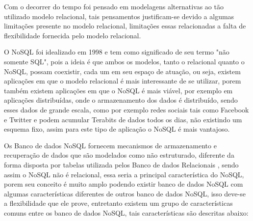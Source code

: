 \documentclass[12pt]{article}
\begin{document}
Com o decorrer do tempo foi pensado em modelagens alternativas ao tão utilizado modelo relacional, tais pensamentos justificam-se devido a algumas limitações presente no modelo relacional, limitações essas relacionadas a falta de flexibilidade fornecida pelo modelo relacional.

O NoSQL foi idealizado em 1998 e tem como significado de seu termo "não somente SQL", pois a ideia é que ambos os modelos, tanto o relacional quanto o NoSQL, possam coexistir, cada um em seu espaço de atuação, ou seja, existem aplicações em que o modelo relacional é mais interessante de se utilizar, porem também existem aplicações em que o NoSQL é mais viável, por exemplo em aplicações distribuídas, onde o armazenamento dos dados é distribuído, sendo esses dados de grande escala, como por exemplo redes sociais tais como Facebook e Twitter e podem acumular Terabits de dados todos os dias, não existindo um esquema fixo, assim para este tipo de aplicação o NoSQL é mais vantajoso.\cite{gueidi:2016} 

Os Banco de dados NoSQL fornecem mecanismos de armazenamento e recuperação de dados que são modelados como não estruturado, diferente da forma disposta por tabelas utilizada pelos Banco de dados Relacionais \cite{zhaoSchema:2014}, sendo assim o NoSQL não é relacional, essa seria a principal característica do NoSQL, porem seu conceito é muito amplo podendo existir banco de dados NoSQL com algumas características diferentes de outros banco de dados NoSQL, isso deve-se a flexibilidade que ele prove, entretanto existem um grupo de características comuns entre os banco de dados NoSQL, tais características são descritas abaixo:
\end{document}
